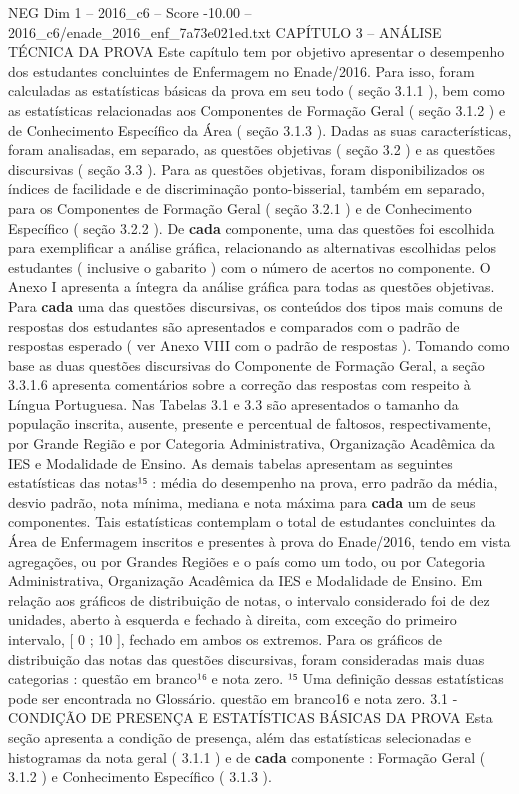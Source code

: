 \begin{textsample}{NEG Dim 1 – 2016\_c6 – Score -10.00 – 2016\_c6/enade\_2016\_enf\_7a73e021ed.txt}  \label{ex:f1_neg_041}
CAPÍTULO 3 – ANÁLISE TÉCNICA DA PROVA Este capítulo tem por objetivo apresentar o desempenho dos estudantes concluintes de Enfermagem no Enade/2016.
Para isso, foram calculadas as estatísticas básicas da prova em seu todo ( seção 3.1.1 ), bem como as estatísticas relacionadas aos Componentes de Formação Geral ( seção 3.1.2 ) e de Conhecimento Específico da Área ( seção 3.1.3 ).
Dadas as suas características, foram analisadas, em separado, as questões objetivas ( seção 3.2 ) e as questões discursivas ( seção 3.3 ).
Para as questões objetivas, foram disponibilizados os índices de facilidade e de discriminação ponto-bisserial, também em separado, para os Componentes de Formação Geral ( seção 3.2.1 ) e de Conhecimento Específico ( seção 3.2.2 ).
De \textbf{cada} componente, uma das questões foi escolhida para exemplificar a análise gráfica, relacionando as alternativas escolhidas pelos estudantes ( inclusive o gabarito ) com o número de acertos no componente.
O Anexo I apresenta a íntegra da análise gráfica para todas as questões objetivas.
Para \textbf{cada} uma das questões discursivas, os conteúdos dos tipos mais comuns de respostas dos estudantes são apresentados e comparados com o padrão de respostas esperado ( ver Anexo VIII com o padrão de respostas ).
Tomando como base as duas questões discursivas do Componente de Formação Geral, a seção 3.3.1.6 apresenta comentários sobre a correção das respostas com respeito à Língua Portuguesa.
Nas Tabelas 3.1 e 3.3 são apresentados o tamanho da população inscrita, ausente, presente e percentual de faltosos, respectivamente, por Grande Região e por Categoria Administrativa, Organização Acadêmica da IES e Modalidade de Ensino.
As demais tabelas apresentam as seguintes estatísticas das notas¹⁵ : média do desempenho na prova, erro padrão da média, desvio padrão, nota mínima, mediana e nota máxima para \textbf{cada} um de seus componentes.
Tais estatísticas contemplam o total de estudantes concluintes da Área de Enfermagem inscritos e presentes à prova do Enade/2016, tendo em vista agregações, ou por Grandes Regiões e o país como um todo, ou por Categoria Administrativa, Organização Acadêmica da IES e Modalidade de Ensino.
Em relação aos gráficos de distribuição de notas, o intervalo considerado foi de dez unidades, aberto à esquerda e fechado à direita, com exceção do primeiro intervalo, [ 0 ; 10 ], fechado em ambos os extremos.
Para os gráficos de distribuição das notas das questões discursivas, foram consideradas mais duas categorias : questão em branco¹⁶ e nota zero. ¹⁵ Uma definição dessas estatísticas pode ser encontrada no Glossário. questão em branco16 e nota zero. 3.1 - CONDIÇÃO DE PRESENÇA E ESTATÍSTICAS BÁSICAS DA PROVA Esta seção apresenta a condição de presença, além das estatísticas selecionadas e histogramas da nota geral ( 3.1.1 ) e de \textbf{cada} componente : Formação Geral ( 3.1.2 ) e Conhecimento Específico ( 3.1.3 ).

\end{textsample}
